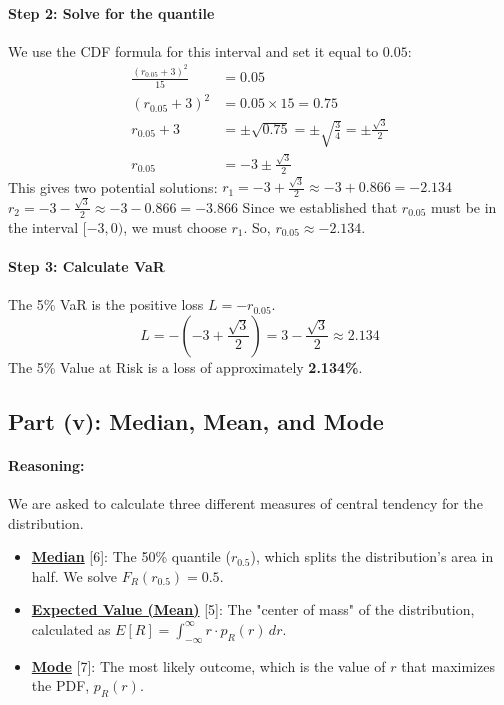 \documentclass[11pt,a4paper]{article}
\newcommand{\concept}[2]{\hyperlink{note:#1}{#2}}
\begin{document}
\paragraph{Step 2: Solve for the quantile}
We use the CDF formula for this interval and set it equal to $0.05$:
\begin{align*}
    \frac{(r_{0.05}+3)^2}{15} &= 0.05 \\
    (r_{0.05}+3)^2 &= 0.05 \times 15 = 0.75 \\
    r_{0.05}+3 &= \pm\sqrt{0.75} = \pm\sqrt{\frac{3}{4}} = \pm\frac{\sqrt{3}}{2} \\
    r_{0.05} &= -3 \pm \frac{\sqrt{3}}{2}
\end{align*}
This gives two potential solutions:
$r_1 = -3 + \frac{\sqrt{3}}{2} \approx -3 + 0.866 = -2.134$
$r_2 = -3 - \frac{\sqrt{3}}{2} \approx -3 - 0.866 = -3.866$
Since we established that $r_{0.05}$ must be in the interval $[-3, 0)$, we must choose $r_1$. So, $r_{0.05} \approx -2.134$.

\paragraph{Step 3: Calculate VaR}
The 5\% VaR is the positive loss $L = -r_{0.05}$.
\[ L = - \left(-3 + \frac{\sqrt{3}}{2}\right) = 3 - \frac{\sqrt{3}}{2} \approx 2.134 \]
The 5\% Value at Risk is a loss of approximately \textbf{2.134\%}.

\subsection{Part (v): Median, Mean, and Mode}
\paragraph{Reasoning:}
We are asked to calculate three different measures of central tendency for the distribution.
\begin{itemize}
    \item \textbf{\concept{median}{Median}} [6]: The 50\% quantile ($r_{0.5}$), which splits the distribution's area in half. We solve $F_R(r_{0.5}) = 0.5$.
    \item \textbf{\concept{mean}{Expected Value (Mean)}} [5]: The "center of mass" of the distribution, calculated as $E[R] = \int_{-\infty}^{\infty} r \cdot p_R(r) \,dr$.
    \item \textbf{\concept{mode}{Mode}} [7]: The most likely outcome, which is the value of $r$ that maximizes the PDF, $p_R(r)$.
\end{itemize}
\end{document}
